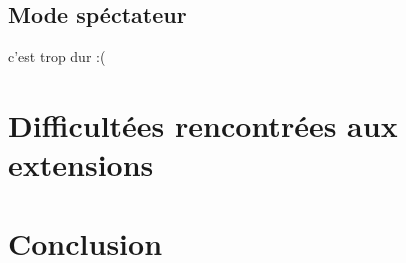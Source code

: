 \documentclass[11pt]{report}
\begin{document}
\subsection*{Mode spéctateur}

c'est trop dur :(


\newpage
\section{Difficultées rencontrées aux extensions}


\newpage

\section{Conclusion}
\end{document}
